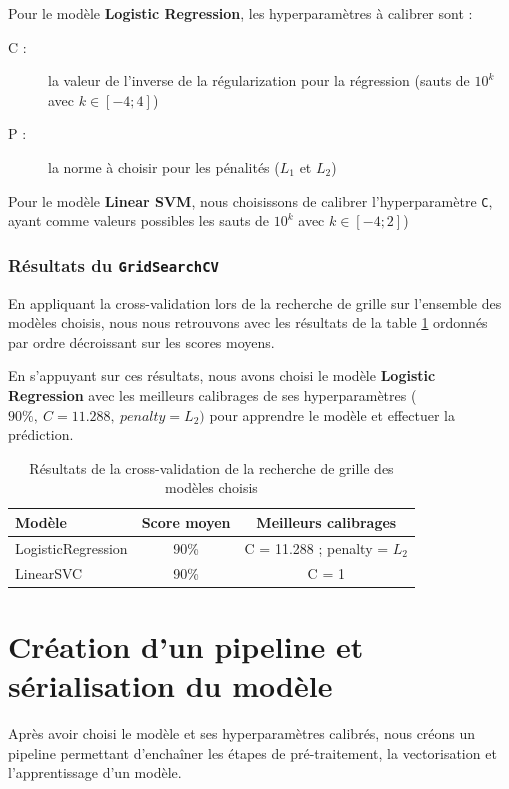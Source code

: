 \documentclass[12pt,a4paper]{report}
\theoremstyle{definition}
\begin{document}
Pour le modèle \textbf{Logistic Regression}, les hyperparamètres à calibrer sont :
\begin{description}
  \item [C :] la valeur de l’inverse de la régularization pour la régression (sauts de $10^k$ avec $k \in [-4; 4]$)
  \item [P :] la norme à choisir pour les pénalités ($L_1$ et $L_2$)
\end{description}

Pour le modèle \textbf{Linear SVM}, nous choisissons de calibrer l'hyperparamètre \texttt{C}, ayant comme valeurs possibles les sauts de $10^k$ avec $k \in [-4; 2]$)

\subsubsection{Résultats du \texttt{GridSearchCV}}
En appliquant la cross-validation lors de la recherche de grille sur l’ensemble des modèles choisis, nous nous retrouvons avec les résultats de la table \ref{table:gridsearch_cv} ordonnés par ordre décroissant sur les scores moyens.

En s'appuyant sur ces résultats, nous avons choisi le modèle \textbf{Logistic Regression} avec les meilleurs calibrages de ses hyperparamètres ($90\%,~ C = 11.288,~ penalty = L_2)$ pour apprendre le modèle et effectuer la prédiction.

\begin{table}
  \centering
  \begin{tabular}{|p{5cm}|c|c|}
    \hline
    \textbf{Modèle} & \textbf{Score moyen} & \textbf{Meilleurs calibrages}\\
    \hline
    \hline
    LogisticRegression & 90\% & C = 11.288 ; penalty = $L_2$\\
    \hline
    LinearSVC & 90\% & C = 1\\
    \hline
  \end{tabular}
  \caption{Résultats de la cross-validation de la recherche de grille des modèles choisis}
  \label{table:gridsearch_cv}
\end{table}

\section{Création d'un pipeline et sérialisation du modèle}
Après avoir choisi le modèle et ses hyperparamètres calibrés, nous créons un pipeline permettant d'enchaîner les étapes de pré-traitement, la vectorisation et l'apprentissage d'un modèle.
\end{document}
